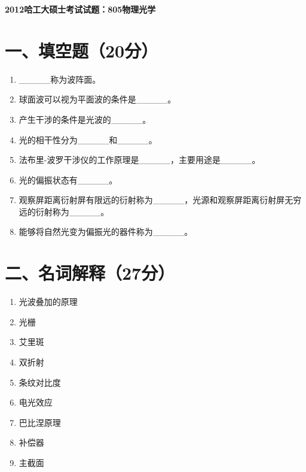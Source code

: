 \documentclass[12pt, a4paper]{article}
\theoremstyle{solution}
\begin{document}
\begin{center}
\Large\textbf{2012哈工大硕士考试试题：805物理光学}
\end{center}





\section*{一、填空题（20分）}
\begin{enumerate}
    \item \_\_\_\_\_称为波阵面。
    \item 球面波可以视为平面波的条件是\_\_\_\_\_。
    \item 产生干涉的条件是光波的\_\_\_\_\_。
    \item 光的相干性分为\_\_\_\_\_和\_\_\_\_\_。
    \item 法布里-波罗干涉仪的工作原理是\_\_\_\_\_，主要用途是\_\_\_\_\_。
    \item 光的偏振状态有\_\_\_\_\_。
    \item 观察屏距离衍射屏有限远的衍射称为\_\_\_\_\_，光源和观察屏距离衍射屏无穷远的衍射称为\_\_\_\_\_。
    \item 能够将自然光变为偏振光的器件称为\_\_\_\_\_。
\end{enumerate}
\section*{二、名词解释（27分）}
\begin{enumerate}
    \item 光波叠加的原理
    \item 光栅
    \item 艾里斑
    \item 双折射
    \item 条纹对比度
    \item 电光效应
    \item 巴比涅原理
    \item 补偿器
    \item 主截面
\end{enumerate}
\end{document}
